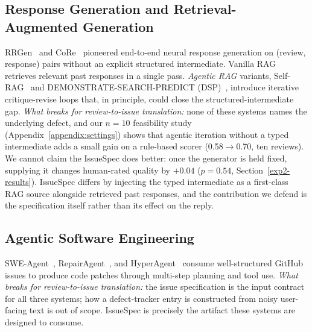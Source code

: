 \documentclass[sigconf, anonymous]{acmart}
\begin{document}
\subsection{Response Generation and Retrieval-Augmented Generation}
RRGen~\cite{gao2019automating} and CoRe~\cite{gao2021automating} pioneered end-to-end neural response generation on (review, response) pairs without an explicit structured intermediate. Vanilla RAG~\cite{lewis2020retrieval} retrieves relevant past responses in a single pass. \emph{Agentic RAG} variants, Self-RAG~\cite{asai2024self} and DEMONSTRATE-SEARCH-PREDICT (DSP)~\cite{khattab2022demonstrate}, introduce iterative critique-revise loops that, in principle, could close the structured-intermediate gap. \emph{What breaks for review-to-issue translation:} none of these systems names the underlying defect, and our $n=10$ feasibility study (Appendix~\ref{appendix:settings}) shows that agentic iteration without a typed intermediate adds a small gain on a rule-based scorer (0.58$\to$0.70, ten reviews). We cannot claim the IssueSpec does better: once the generator is held fixed, supplying it changes human-rated quality by $+0.04$ ($p = 0.54$, Section~\ref{exp2-results}). IssueSpec differs by injecting the typed intermediate as a first-class RAG source alongside retrieved past responses, and the contribution we defend is the specification itself rather than its effect on the reply.

\subsection{Agentic Software Engineering}
SWE-Agent~\cite{yang2024swe}, RepairAgent~\cite{bouzenia2025repairagent}, and HyperAgent~\cite{phan2024hyperagent} consume well-structured GitHub issues to produce code patches through multi-step planning and tool use. \emph{What breaks for review-to-issue translation:} the issue specification is the input contract for all three systems; how a defect-tracker entry is constructed from noisy user-facing text is out of scope. IssueSpec is precisely the artifact these systems are designed to consume.
\end{document}
